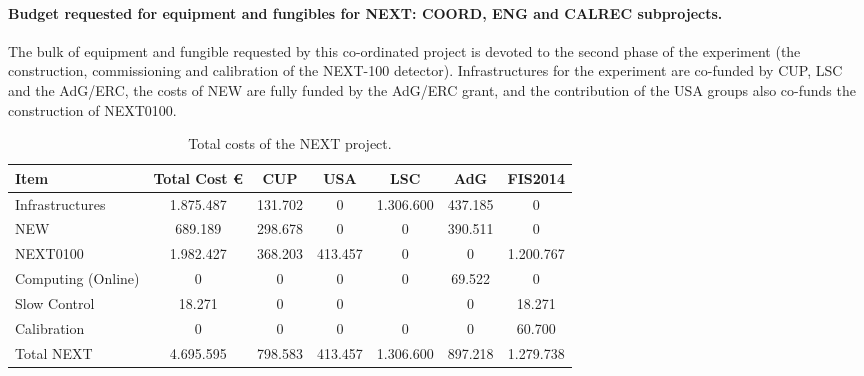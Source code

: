 \paragraph{Budget requested for equipment and fungibles for NEXT: COORD, ENG and CALREC subprojects.}

The bulk of equipment and fungible requested by this co-ordinated project is devoted to the second phase of the experiment (the construction, commissioning and calibration of the NEXT-100 detector). 
 Infrastructures for the experiment are co-funded by CUP, LSC and the AdG/ERC, the costs of NEW are fully funded by the AdG/ERC grant, and the contribution of the USA groups also co-funds the construction of NEXT0100. 

\begin{table}[h!]
\begin{center}
\begin{tabular}{|l|c|c|c|c|c|c|}
\hline
 Item & Total Cost \euro & CUP	&USA &	LSC & AdG &	FIS2014 \\
 \hline
Infrastructures 	& 1.875.487 & 	131.702 & 	0 &	1.306.600 &	437.185 &	0 \\
NEW &	 689.189 & 	298.678 & 	0 &	0 &	390.511 &	0 \\	
NEXT0100	 &1.982.427 & 	368.203 &	413.457 &	0 &	0 &	1.200.767 \\
Computing (Online) & 0 & 0 & 	0 &	0 &	69.522 &	0 	\\
Slow Control & 18.271 & 	0 &	0 &	 &	0 & 18.271	\\
Calibration &	 0 & 	0 &	0 &	0 &	0  & 60.700	\\
 \hline
Total  NEXT &	 4.695.595 & 	798.583 &	413.457 &	1.306.600 &	897.218 &	1.279.738 \\
 \hline\hline
\end{tabular}  
\caption{Total costs of the NEXT project.}
\label{tab.TCOSTS}
\end{center}
\end{table} 

